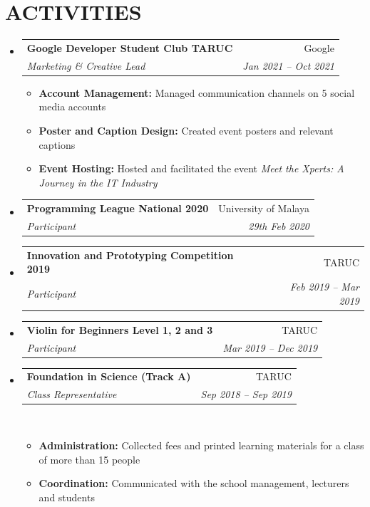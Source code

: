 \documentclass[a4paper,11pt]{article}
\makeatletter
\newcommand{\resumeItem}[2]{
  \item\small{
    \textbf{{#1:} }{#2 \vspace{-2pt}}
  }
}
\newcommand{\resumeSubheading}[4]{
  \vspace{-1pt}\item
    \begin{tabular*}{0.97\textwidth}[t]{l@{\extracolsep{\fill}}r}
      \textbf{\color{MyBlue} #1} & {\footnotesize#2} \\
      \textit{\footnotesize #3} & \textit{\footnotesize #4} \\
    \end{tabular*}\vspace{-5pt}
}
\newcommand{\resumeSubHeadingListStart}{\begin{itemize}[leftmargin=*]}
\newcommand{\resumeSubHeadingListEnd}{\end{itemize}}
\newcommand{\resumeItemListStart}{\begin{itemize}}
\newcommand{\resumeItemListEnd}{\end{itemize}\vspace{-5pt}}
\makeatother
\begin{document}
\section{ACTIVITIES}
\resumeSubHeadingListStart
\resumeSubheading{Google Developer Student Club TARUC}{Google}
{Marketing \& Creative Lead}{Jan 2021 -- Oct 2021}
\resumeItemListStart
\resumeItem{Account Management}{Managed communication channels on 5 social media accounts}
\resumeItem{Poster and Caption Design}{Created event posters and relevant captions}
\resumeItem{Event Hosting}{Hosted and facilitated the event \textit{Meet the Xperts: A Journey in the IT Industry}}
\resumeItemListEnd

\resumeSubheading{Programming League National 2020}{University of Malaya}
{Participant}{29th Feb 2020}

\resumeSubheading{Innovation and Prototyping Competition 2019}{TARUC}{Participant}{Feb 2019 -- Mar 2019}

\resumeSubheading{Violin for Beginners Level 1, 2 and 3}{TARUC}{Participant}{Mar 2019 -- Dec 2019}

\resumeSubheading{Foundation in Science (Track A)}{TARUC}{Class Representative}{Sep 2018 -- Sep 2019}\
\resumeItemListStart
\resumeItem{Administration}{Collected fees and printed learning materials for a class of more than 15 people}
\resumeItem{Coordination}{Communicated with the school management, lecturers and students}
\resumeItemListEnd
\resumeSubHeadingListEnd

%


\end{document}

